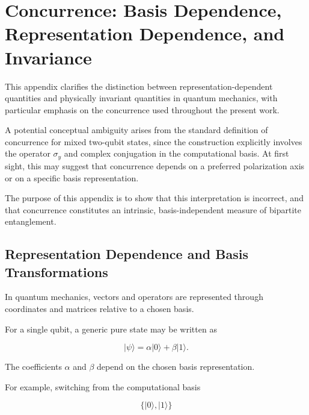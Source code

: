 
\section{Concurrence: Basis Dependence, Representation Dependence, and Invariance}

This appendix clarifies the distinction between representation-dependent quantities and physically invariant quantities in quantum mechanics, with particular emphasis on the concurrence used throughout the present work.

\medskip

A potential conceptual ambiguity arises from the standard definition of concurrence for mixed two-qubit states, since the construction explicitly involves the operator \( \sigma_y \) and complex conjugation in the computational basis. At first sight, this may suggest that concurrence depends on a preferred polarization axis or on a specific basis representation.

The purpose of this appendix is to show that this interpretation is incorrect, and that concurrence constitutes an intrinsic, basis-independent measure of bipartite entanglement.


\subsection*{Representation Dependence and Basis Transformations}

In quantum mechanics, vectors and operators are represented through coordinates and matrices relative to a chosen basis.

For a single qubit, a generic pure state may be written as

\[
|\psi\rangle
=
\alpha |0\rangle
+
\beta |1\rangle.
\]

The coefficients \( \alpha \) and \( \beta \) depend on the chosen basis representation.

For example, switching from the computational basis

\[
\{|0\rangle, |1\rangle\}
\]

